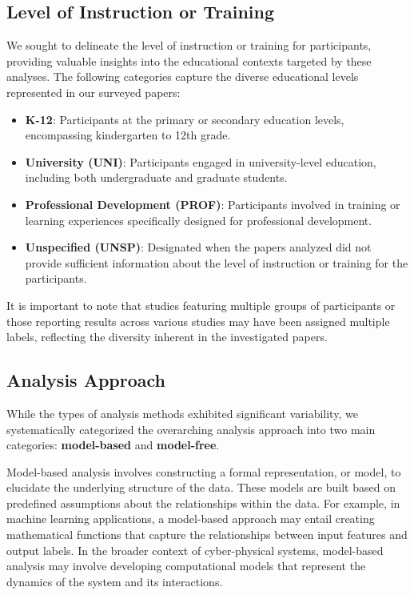 \documentclass[manuscript,screen,review]{acmart}
\begin{document}
\subsection{Level of Instruction or Training} \label{subsec:level_of_instruction}
We sought to delineate the level of instruction or training for participants, providing valuable insights into the educational contexts targeted by these analyses. The following categories capture the diverse educational levels represented in our surveyed papers:

\begin{itemize}
    \item \textbf{K-12}: Participants at the primary or secondary education levels, encompassing kindergarten to 12th grade.
    \item \textbf{University (UNI)}: Participants engaged in university-level education, including both undergraduate and graduate students.
    \item \textbf{Professional Development (PROF)}: Participants involved in training or learning experiences specifically designed for professional development.
    \item \textbf{Unspecified (UNSP)}: Designated when the papers analyzed did not provide sufficient information about the level of instruction or training for the participants.
\end{itemize}

It is important to note that studies featuring multiple groups of participants or those reporting results across various studies may have been assigned multiple labels, reflecting the diversity inherent in the investigated papers.

\subsection{Analysis Approach} \label{subsec:analysis_approach}

While the types of analysis methods exhibited significant variability, we systematically categorized the overarching analysis approach into two main categories: \textbf{model-based} and \textbf{model-free}.

Model-based analysis involves constructing a formal representation, or model, to elucidate the underlying structure of the data. These models are built based on predefined assumptions about the relationships within the data. For example, in machine learning applications, a model-based approach may entail creating mathematical functions that capture the relationships between input features and output labels. In the broader context of cyber-physical systems, model-based analysis may involve developing computational models that represent the dynamics of the system and its interactions.
\end{document}
